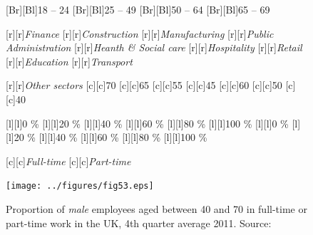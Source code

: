 \documentclass[11 pt, a4paper]{report}
\begin{document}
\begin{figure}[hbtp!]
[Br][Bl]{\small{18 -- 24}}
[Br][Bl]{\small{25 -- 49}}
[Br][Bl]{\small{50 -- 64}}
[Br][Bl]{\small{65 -- 69}}


[r][r]{\small{\emph{Finance}}}
[r][r]{\small{\emph{Construction}}}
[r][r]{\small{\emph{Manufacturing}}}
[r][r]{\small{\emph{Public Administration}}}
[r][r]{\small{\emph{Heanth \& Social care}}}
[r][r]{\small{\emph{Hospitality}}}
[r][r]{\small{\emph{Retail}}}
[r][r]{\small{\emph{Education}}}
[r][r]{\small{\emph{Transport}}}

[r][r]{\small{\emph{Other sectors}}}
[c][c]{\small{70}}
[c][c]{\small{65}}
[c][c]{\small{55}}
[c][c]{\small{45}}
[c][c]{\small{60}}
[c][c]{\small{50}}
[c][c]{\small{40}}

[l][l]{\small{0 \%}}
[l][l]{\small{20 \%}}
[l][l]{\small{40 \%}}
[l][l]{\small{60 \%}}
[l][l]{\small{80 \%}}
[l][l]{\small{100 \%}}
[l][l]{\small{0 \%}}
[l][l]{\small{20 \%}}
[l][l]{\small{40 \%}}
[l][l]{\small{60 \%}}
[l][l]{\small{80 \%}}
[l][l]{\small{100 \%}}

[c][c]{\small{\emph{Full-time}}}
[c][c]{\small{\emph{Part-time}}}

\texttt{[image: ../figures/fig53.eps]}
\caption{Proportion of \emph{male} employees aged between 40 and 70 in full-time or part-time work in the UK, 4th quarter average 2011. Source: \cite{DWP2013}}\label{Fig:53}
\end{figure}
\end{document}
